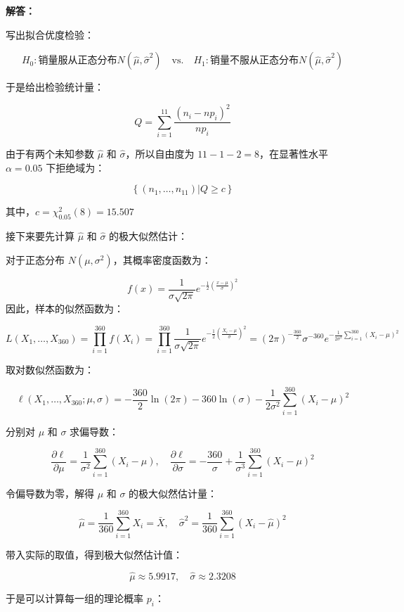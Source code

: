 \documentclass[12pt,a4paper]{article}
\begin{document}
\begin{answerbox}
\textbf{解答：}

写出拟合优度检验：

$$
H_0: \text{销量服从正态分布} N(\hat\mu, \hat\sigma^2) \quad \text{vs.} \quad H_1: \text{销量不服从正态分布} N(\hat\mu, \hat\sigma^2)
$$

于是给出检验统计量：

$$
Q = \sum_{i=1}^{11} \frac{(n_i - n p_i)^2}{n p_i}
$$

由于有两个未知参数 $\hat\mu$ 和 $\hat\sigma$，所以自由度为 $11 - 1 - 2 = 8$，在显著性水平 $\alpha=0.05$ 下拒绝域为：

$$
\left\{(n_1, \ldots, n_{11}) | Q \geq c\right\}
$$

其中，$c = \chi^2_{0.05}(8) = 15.507$

接下来要先计算 $\hat\mu$ 和 $\hat\sigma$ 的极大似然估计：

对于正态分布 $N(\mu, \sigma^2)$，其概率密度函数为：

$$
f(x) = \frac{1}{\sigma\sqrt{2\pi}} e^{-\frac{1}{2}\left(\frac{x-\mu}{\sigma}\right)^2}
$$
因此，样本的似然函数为：

$$
L\left(X_1, \ldots, X_{360}\right) = \prod_{i=1}^{360} f(X_i) = \prod_{i=1}^{360} \frac{1}{\sigma\sqrt{2\pi}} e^{-\frac{1}{2}\left(\frac{X_i-\mu}{\sigma}\right)^2} = (2\pi)^{-\frac{360}{2}} \sigma^{-360} e^{-\frac{1}{2\sigma^2} \sum_{i=1}^{360} (X_i - \mu)^2}
$$

取对数似然函数为：

$$
\ell\left(X_1, \ldots, X_{360}; \mu, \sigma\right) = -\frac{360}{2} \ln(2\pi) - 360 \ln(\sigma) - \frac{1}{2\sigma^2} \sum_{i=1}^{360} (X_i - \mu)^2
$$

分别对 $\mu$ 和 $\sigma$ 求偏导数：

$$
\frac{\partial \ell}{\partial \mu} = \frac{1}{\sigma^2} \sum_{i=1}^{360} (X_i - \mu), \quad \frac{\partial \ell}{\partial \sigma} = -\frac{360}{\sigma} + \frac{1}{\sigma^3} \sum_{i=1}^{360} (X_i - \mu)^2
$$

令偏导数为零，解得 $\mu$ 和 $\sigma$ 的极大似然估计量：

$$
\hat{\mu} = \frac{1}{360} \sum_{i=1}^{360} X_i = \bar{X}, \quad \hat{\sigma}^2 = \frac{1}{360} \sum_{i=1}^{360} (X_i - \hat{\mu})^2
$$

带入实际的取值，得到极大似然估计值：

$$
\hat{\mu} \approx 5.9917, \quad \hat{\sigma} \approx 2.3208
$$

于是可以计算每一组的理论概率 $p_i$：


\end{answerbox}
\end{document}
